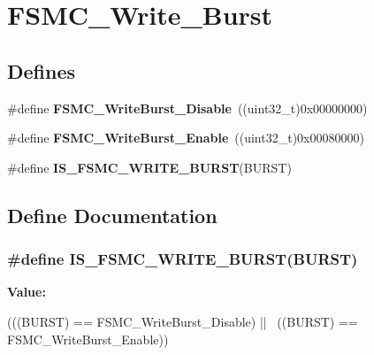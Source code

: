 \hypertarget{group__FSMC__Write__Burst}{
\section{FSMC\_\-Write\_\-Burst}
\label{group__FSMC__Write__Burst}
}
\subsection*{Defines}
\begin{DoxyCompactItemize}
\item 
\hypertarget{group__FSMC__Write__Burst_ga65a49ecd05b3a128e8908c6a625adae7}{
\#define {\bfseries FSMC\_\-WriteBurst\_\-Disable}~((uint32\_\-t)0x00000000)}
\label{group__FSMC__Write__Burst_ga65a49ecd05b3a128e8908c6a625adae7}

\item 
\hypertarget{group__FSMC__Write__Burst_ga1b2b66a0eb42778c2cc9a05003cf7655}{
\#define {\bfseries FSMC\_\-WriteBurst\_\-Enable}~((uint32\_\-t)0x00080000)}
\label{group__FSMC__Write__Burst_ga1b2b66a0eb42778c2cc9a05003cf7655}

\item 
\#define {\bfseries IS\_\-FSMC\_\-WRITE\_\-BURST}(BURST)
\end{DoxyCompactItemize}


\subsection{Define Documentation}
\hypertarget{group__FSMC__Write__Burst_gab7b03a33fab765827832abbf07d01a10}{
\subsubsection[{IS\_\-FSMC\_\-WRITE\_\-BURST}]{\setlength{\rightskip}{0pt plus 5cm}\#define IS\_\-FSMC\_\-WRITE\_\-BURST(BURST)}}
\label{group__FSMC__Write__Burst_gab7b03a33fab765827832abbf07d01a10}
{\bfseries Value:}
\begin{DoxyCode}
(((BURST) == FSMC_WriteBurst_Disable) || \
                                    ((BURST) == FSMC_WriteBurst_Enable))
\end{DoxyCode}
